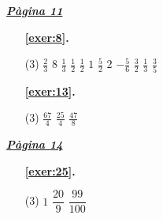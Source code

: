 \hyperlink{page.11}{\textbf{\em Pàgina 11}}
\begin{enumerate}



 \item[\fontfamily{phv}\selectfont\color{blue}\textbf{\ref{exer:8}. }] \label{ans:8}
 \begin{tasks}[column-sep=1em, item-indent=1.3333em](3)
	 \task $\frac {2}{3}$
	 \task $8$
	 \task $\frac {1}{3}$
	 \task $\frac {1}{2}$
	 \task $\frac {1}{2}$
	 \task $1$
	 \task $\frac {5}{2}$
	 \task $2$
	 \task $-\frac {5}{6}$
	 \task $\frac {3}{2}$
	 \task $\frac {1}{3}$
	 \task $\frac {3}{5}$
\end{tasks}
 \end{enumerate}
\begin{enumerate}



 \item[\fontfamily{phv}\selectfont\color{blue}\textbf{\ref{exer:13}. }] \label{ans:13}
 \begin{tasks}[column-sep=1em, item-indent=1.3333em](3)
	 \task $\frac {67}{4}$
	 \task $\frac {25}{4}$
	 \task $\frac {47}{8}$
\end{tasks}
 \end{enumerate}
\vspace{0.3cm}


\hyperlink{page.14}{\textbf{\em Pàgina 14}}
\begin{enumerate}



 \item[\fontfamily{phv}\selectfont\color{blue}\textbf{\ref{exer:25}. }] \label{ans:25}
 \begin{tasks}[column-sep=1em, item-indent=1.3333em](3)
	 \task $1$
	 \task $\dfrac {20}{9}$
	 \task $\dfrac {99}{100}$
\end{tasks}
 \end{enumerate}
\vspace{0.3cm}


